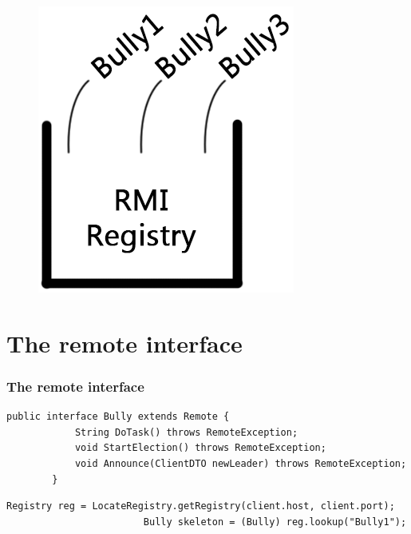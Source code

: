 \documentclass{beamer}
\begin{document}
\begin{frame}
\begin{figure}[H]
\begin{minipage}[b]{0.4\linewidth}
			\includegraphics[width=\linewidth]{RMI-reg}
			\end{minipage}
		\end{figure}
				
	\end{frame}
	
	
\section{The remote interface}
	\begin{frame}[fragile]
		\frametitle{The remote interface}

		\begin{lstlisting}[caption=Remote interface, style=Code-Java]
		public interface Bully extends Remote {
			String DoTask() throws RemoteException;
			void StartElection() throws RemoteException;
			void Announce(ClientDTO newLeader) throws RemoteException;
		}
		\end{lstlisting}
		
		
		\begin{lstlisting}[caption=Call client, style=Code-Java]
		Registry reg = LocateRegistry.getRegistry(client.host, client.port);
						Bully skeleton = (Bully) reg.lookup("Bully1");
		\end{lstlisting}
	
	\end{frame}
	
\end{document}
